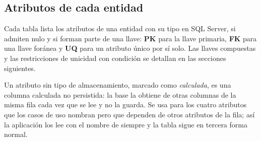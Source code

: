 \subsection*{Atributos de cada entidad}

Cada tabla lista los atributos de una entidad con su tipo en SQL Server, si admiten nulo y si forman parte de una llave: \textbf{PK} para la llave primaria, \textbf{FK} para una llave foránea y \textbf{UQ} para un atributo único por sí solo. Las llaves compuestas y las restricciones de unicidad con condición se detallan en las secciones siguientes.

Un atributo sin tipo de almacenamiento, marcado como \emph{calculada}, es una columna calculada no persistida: la base la obtiene de otras columnas de la misma fila cada vez que se lee y no la guarda. Se usa para los cuatro atributos que los casos de uso nombran pero que dependen de otros atributos de la fila; así la aplicación los lee con el nombre de siempre y la tabla sigue en tercera forma normal.


